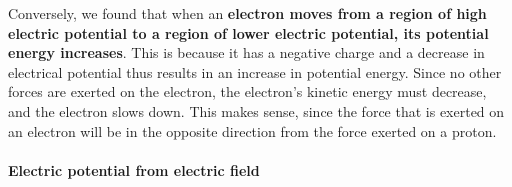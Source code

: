 \begin{framed}
\begin{framed}
Conversely, we found that when an \textbf{electron moves from a region of high electric potential to a region of lower electric potential, its potential energy increases}. This is because it has a negative charge and a decrease in electrical potential thus results in an increase in potential energy. Since no other forces are exerted on the electron, the electron's kinetic energy must decrease, and the electron slows down. This makes sense, since the force that is exerted on an electron will be in the opposite direction from the force exerted on a proton.
\end{framed}
\end{framed}

\paragraph{Electric potential from electric field}


